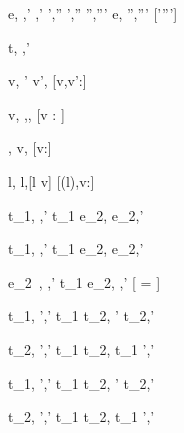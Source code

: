     {e,\hat{\sigma} \hat{\eval} ,\hat{\sigma}'  \Quad
     ,\hat{\sigma}' \hat{\stride} ',\hat{\sigma}''  \Quad
     ',\hat{\sigma}'' \hat{\normalise} '',\hat{\sigma}'''}
    {e,\hat{\sigma} \hat{\normalise} '',\hat{\sigma}'''}
    [\hat{\sigma}'\neq \hat{\sigma}''\vee {}\neq {}']




  {t,\hat{\sigma}  ,\hat{\sigma}'}


  { }
  {\Edit v,\hat{\sigma} ' \Edit v',\hat{\sigma}}
  [v,v':\tau]

  { }
  {\Edit v,\sigma \handle{\Empty} \Enter \tau,\sigma,\True}
  [v : \tau]

  { }
  {\Enter \tau,\hat{\sigma}  \Edit v,\hat{\sigma}}
  [v:\tau]

  { }
  {\Update l,\hat{\sigma}  \Update l,\hat{\sigma}[l \mapsto v]}
  [\sigma(l),v:\tau]

  {t_1,\sigma {} ,\sigma'}
  {t_1 \Then e_2,\sigma {}  \Then e_2,\sigma'}

  {t_1,\sigma {} ,\sigma'}
  {t_1 \Next e_2,\sigma {}  \Next e_2,\sigma'}

  {e_2\ ,\sigma \hat{\normalise} ,\hat{\sigma}'}
  {t_1 \Next e_2,\sigma \xrightarrow[]{\Continue} ,\hat{\sigma}'}
  [ =  \land \neg{}]


  {t_1,\sigma {} ',\hat{\sigma}'}
  {t_1 \And t_2,\sigma {} ' \And t_2,\hat{\sigma}'}

  {t_2,\sigma {} ',\hat{\sigma}'}
  {t_1 \And t_2,\sigma {} t_1 \And {}',\hat{\sigma}'}


  {t_1,\sigma {} ',\hat{\sigma}'}
  {t_1 \Or t_2,\sigma {} ' \Or t_2,\hat{\sigma}'}

  {t_2,\sigma {} ',\hat{\sigma}' }
  {t_1 \Or t_2,\sigma {} t_1 \Or {}',\hat{\sigma}'}


